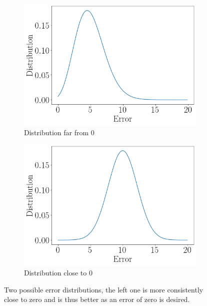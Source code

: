\begin{figure}[htb]
  \centering
  \begin{subfigure}{0.47\textwidth}
    \includegraphics[width=\linewidth]{./img/poisson_distribution.png}
    \caption{Distribution far from 0}
    \label{fig:poisson}
  \end{subfigure}
  \hfill
  \begin{subfigure}{0.47\textwidth}
    \includegraphics[width=\linewidth]{./img/normal_distribution.png}
    \caption{Distribution close to 0}
    \label{fig:normal}
  \end{subfigure}
  \hfill
  \caption{Two possible error distributions, the left one is more consistently close to zero and is thus better as an error of zero is desired.}
  \label{fig:example_distributions}
\end{figure}

